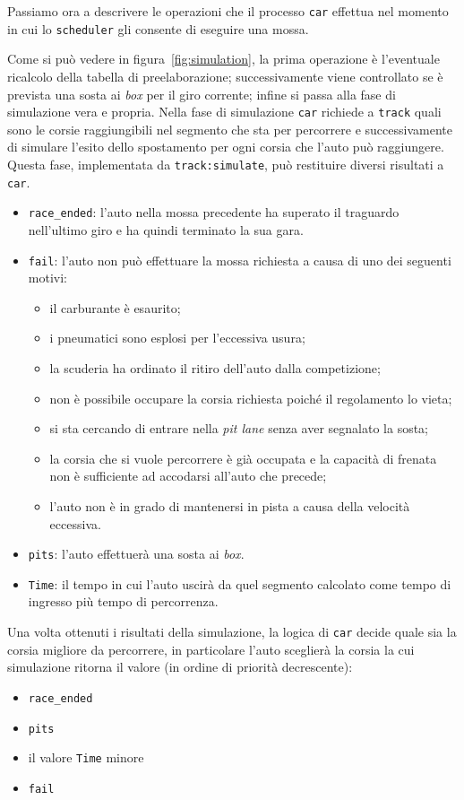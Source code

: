 \documentclass[a4paper]{report}
\newcommand{\fun}[1]{\texttt{#1}}
\begin{document}
Passiamo ora a descrivere le operazioni che il processo \texttt{car} effettua nel momento in cui lo \texttt{scheduler} gli consente di eseguire una mossa.

Come si può vedere in figura~\ref{fig:simulation}, la prima operazione è l'eventuale ricalcolo della tabella di preelaborazione; successivamente viene controllato se è prevista una sosta ai \textit{box} per il giro corrente; infine si passa alla fase di simulazione vera e propria. Nella fase di simulazione \texttt{car} richiede a \texttt{track} quali sono le corsie raggiungibili nel segmento che sta per percorrere e successivamente di simulare l'esito dello spostamento per ogni corsia che l'auto può raggiungere. Questa fase, implementata da \fun{track:simulate}, può restituire diversi risultati a \texttt{car}.
\begin{itemize}
\item \texttt{race\_ended}: l'auto nella mossa precedente ha superato il traguardo nell'ultimo giro e ha quindi terminato la sua gara.
\item \texttt{fail}: l'auto non può effettuare la mossa richiesta a causa di uno dei seguenti motivi:
	\begin{itemize}
	\item il carburante è esaurito;
	\item i pneumatici sono esplosi per l'eccessiva usura;
	\item la scuderia ha ordinato il ritiro dell'auto dalla competizione;
	\item non è possibile occupare la corsia richiesta poiché il regolamento lo vieta;
	\item si sta cercando di entrare nella \textit{pit lane} senza aver segnalato la sosta;
	\item la corsia che si vuole percorrere è già occupata e la capacità di frenata non è sufficiente ad accodarsi all'auto che precede;
	\item l'auto non è in grado di mantenersi in pista a causa della velocità eccessiva.
	\end{itemize}
\item \texttt{pits}: l'auto effettuerà una sosta ai \textit{box}.
\item \texttt{Time}: il tempo in cui l'auto uscirà da quel segmento calcolato come tempo di ingresso più tempo di percorrenza.
\end{itemize}
Una volta ottenuti i risultati della simulazione, la logica di \texttt{car} decide quale sia la corsia migliore da percorrere, in particolare l'auto sceglierà la corsia la cui simulazione ritorna il valore (in ordine di priorità decrescente):
\begin{itemize}
\item \texttt{race\_ended}
\item \texttt{pits}
\item il valore \texttt{Time} minore
\item \texttt{fail}
\end{itemize}
\end{document}

